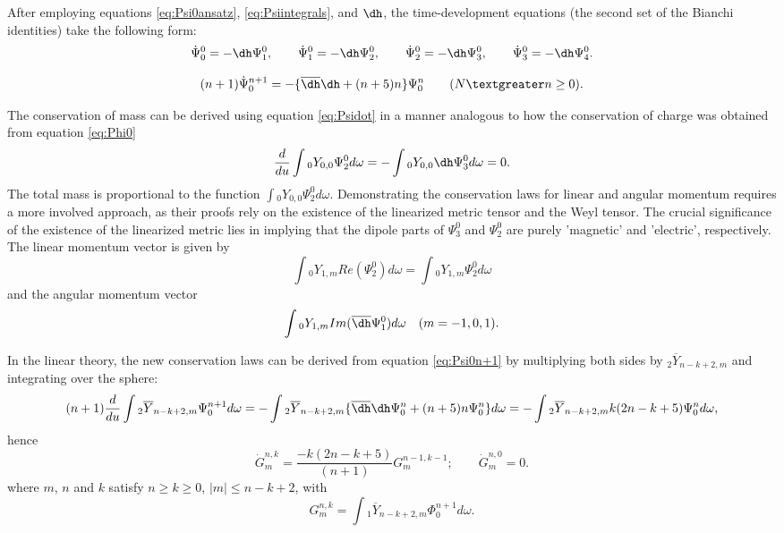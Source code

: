 After employing equations \eqref{eq:Psi0ansatz}, \eqref{eq:Psiintegrals}, and $\dh$, the time-development equations (the second set of the Bianchi identities) take the following form:
\begin{equation}\label{eq:Psidot}
  \dot{\Psi}_{0}^{0} = -\dh \Psi_{1}^{0}, \qquad \dot{\Psi}_{1}^{0} = -\dh \Psi_{2}^{0}, \qquad \dot{\Psi}_{2}^{0} = -\dh \Psi_{3}^{0}, \qquad \dot{\Psi}_{3}^{0} = -\dh \Psi_{4}^{0}.
\end{equation}

\begin{equation}\label{eq:Psi0n+1}
  (n+1)\dot{\Psi}_{0}^{n+1} = -\{\overline{\dh}\dh + (n+5)n\}\Psi_{0}^{n} \qquad (N \textgreater n \geq 0).
\end{equation}

The conservation of mass can be derived using equation \eqref{eq:Psidot} in a manner analogous to how the conservation of charge was obtained from equation \eqref{eq:Phi0}
\begin{equation}\label{eq:YPsi0}
  \frac{d}{du} \int {_{0}Y_{0,0}\Psi_{2}^{0} d\omega} = - \int {_{0}Y_{0,0}\dh \Psi_{3}^{0} d\omega} = 0.
\end{equation}
The total mass is proportional to the function $\int {_{0}Y_{0,0}\Psi_{2}^{0} d\omega}$. Demonstrating the conservation laws for linear and angular momentum requires a more involved approach, as their proofs rely on the existence of the linearized metric tensor and the Weyl tensor. The crucial significance of the existence of the linearized metric lies in implying that the dipole parts of $\Psi_{3}^{0}$ and $\Psi_{2}^{0}$ are purely 'magnetic' and 'electric', respectively. The linear momentum vector is given by
\begin{equation}\label{eq:LinMomentum}
  \int {_{0}Y_{1,m}Re(\Psi_{2}^{0}) d\omega} = \int{_{0}Y_{1,m}\Psi_{2}^{0} d\omega}
\end{equation}
and the angular momentum vector
\begin{equation}\label{eq:AngMomentum}
  \int {_{0}Y_{1,m}Im(\overline{\dh} \Psi_{1}^{0}) d\omega} \quad (m = -1,0,1).
\end{equation}

In the linear theory, the new conservation laws can be derived from equation \eqref{eq:Psi0n+1} by multiplying both sides by $_{2}\overline{Y}_{n-k+2,m}$ and integrating over the sphere:
\begin{equation}\label{eq:intYoverline}
  (n+1)\frac{d}{du}\int{_{2}\overline{Y}_{n-k+2,m}\Psi_{0}^{n+1} d\omega} = - \int{_{2}\overline{Y}_{n-k+2,m}\{\overline{\dh}\dh \Psi_{0}^{n}+(n+5)n\Psi_{0}^{n}\}d\omega} = -\int{_{2}\overline{Y}_{n-k+2,m}k(2n-k+5)\Psi_{0}^{n} d\omega},
\end{equation}
hence 
\begin{equation}\label{eq:Gdot}
  \dot{G}_{m}^{n,k} = \frac{-k(2n-k+5)}{(n+1)}G_{m}^{n-1,k-1} ; \qquad \dot{G}_{m}^{n,0} = 0.
\end{equation}
where $m$, $n$ and $k$ satisfy $n \geq k \geq 0$, $|m| \leq n-k+2$, with
\begin{equation}\label{eq:G}
  G_{m}^{n,k} = \int{_{1}\overline{Y}_{n-k+2,m}\Phi_{0}^{n+1} d\omega}.
\end{equation}

